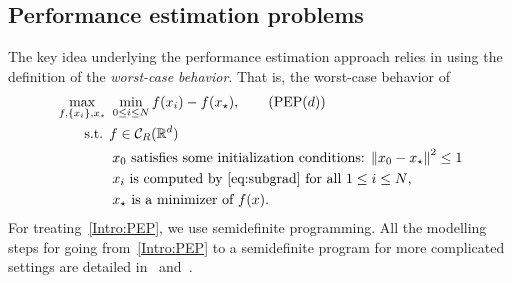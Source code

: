 \documentclass[11pt,a4paper]{article}
\newcommand{\normsq}[1]{{\left\lVert#1\right\rVert}^2}
\newcommand{\Rd}{\mathbb{R}^d}
\begin{document}
\subsection{Performance estimation problems}
The key idea underlying the performance estimation approach relies in using the definition of the \emph{worst-case behavior}. That is, the worst-case behavior of
\begin{align}
&\max_{f,\{x_i\},x_\star} \ \min_{0\leq i\leq N} f(x_i)-f(x_\star),  \tag{PEP$(d)$}\label{Intro:PEP} \\
&\quad\quad \text{s.t. } f\in \mathcal{C}_R(\Rd)  \notag\\
&\quad\quad\quad\quad    x_0 \text{ satisfies some initialization conditions: } \normsq{x_0-x_\star}\leq 1\notag \\
&\quad\quad\quad\quad    x_{i} \text{ is computed by~\eqref{eq:subgrad} for all $1 \le i \le N$,} 
\notag\\
&\quad\quad\quad\quad    x_\star \text{ is a minimizer of } f(x). \notag
\end{align}
For treating~\eqref{Intro:PEP}, we use semidefinite programming. All the modelling steps for going from~\eqref{Intro:PEP} to a semidefinite program for more complicated settings are detailed in~\cite{taylor2015smooth} and~\cite{taylor2015exact}. 
\end{document}
